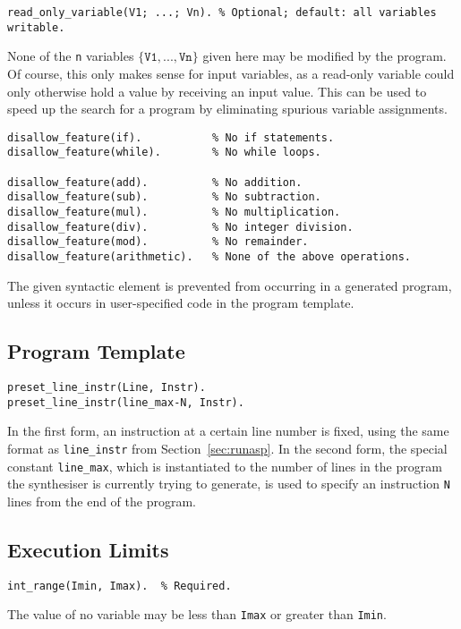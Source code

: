 \documentclass[a4paper,twoside,notitlepage]{report}
\newcommand{\ttt}{\texttt}
\begin{document}
\begin{Verbatim}[samepage=true]
read_only_variable(V1; ...; Vn). % Optional; default: all variables writable.
\end{Verbatim}
None of the \texttt{n} variables $\{\ttt{V1}, ..., \ttt{Vn}\}$ 
given here may be modified by the program. Of course, this only makes sense 
for input variables, as a read-only variable could only otherwise hold a value 
by receiving an input value. This can be used to speed up the search for a 
program by eliminating spurious variable assignments.

\begin{Verbatim}[samepage=true]
disallow_feature(if).           % No if statements.
disallow_feature(while).        % No while loops.

disallow_feature(add).          % No addition.
disallow_feature(sub).          % No subtraction.
disallow_feature(mul).          % No multiplication.
disallow_feature(div).          % No integer division.
disallow_feature(mod).          % No remainder.
disallow_feature(arithmetic).   % None of the above operations.
\end{Verbatim}
The given syntactic element is prevented from occurring in a generated 
program, unless it occurs in user-specified code in the program template.

\subsection{Program Template}
\begin{Verbatim}[samepage=true]
preset_line_instr(Line, Instr).
preset_line_instr(line_max-N, Instr).
\end{Verbatim}
In the first form, an instruction at a certain line number is fixed, using 
the same format as \verb|line_instr| from Section~\ref{sec:runasp}. In the 
second form, the special constant \verb|line_max|, which is instantiated 
to the number of lines in the program the synthesiser is currently trying 
to generate, is used to specify an instruction \verb|N| lines from the 
end of the program.

\subsection{Execution Limits}
\begin{Verbatim}[samepage=true]
int_range(Imin, Imax).  % Required.
\end{Verbatim}
The value of no variable may be less than \ttt{Imax} or greater than 
\ttt{Imin}.
\end{document}
